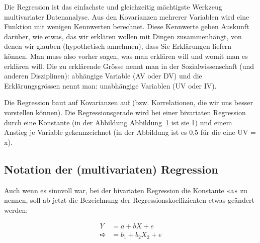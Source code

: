 \documentclass[
  10pt,
  letterpaper,
  a4paper, twoside]{scrreprt}
\begin{document}
Die Regression ist das einfachste und gleichzeitig mächtigste Werkzeug
multivariater Datenanalyse. Aus den Kovarianzen mehrerer Variablen wird
eine Funktion mit wenigen Kennwerten berechnet. Diese Kennwerte geben
Auskunft darüber, wie etwas, das wir erklären wollen mit Dingen
zusammenhängt, von denen wir glauben (hypothetisch annehmen), dass Sie
Erklärungen liefern können. Man muss also vorher sagen, was man erklären
will und womit man es erklären will. Die zu erklärende Grösse nennt man
in der Sozialwissenschaft (und anderen Disziplinen): abhängige Variable
(AV oder DV) und die Erklärungsgrössen nennt man: unabhängige Variablen
(UV oder IV).

Die Regression baut auf Kovarianzen auf (bzw. Korrelationen, die wir uns
besser vorstellen können). Die Regressionsgerade wird bei einer
bivariaten Regression durch eine Konstante (in der Abbildung
Abbildung~\ref{fig-KorrelationRegression} ist sie 1) und einem Anstieg
je Variable gekennzeichnet (in der Abbildung ist es 0,5 für die eine UV
= x).

\begin{figure}


\caption{\label{fig-KorrelationRegression}}

\end{figure}%

\subsection{Notation der (multivariaten)
Regression}\label{notation-der-multivariaten-regression}

Auch wenn es sinnvoll war, bei der bivariaten Regression die Konstante
«a» zu nennen, soll ab jetzt die Bezeichnung der
Regressionskoeffizienten etwas geändert werden:

\begin{tcolorbox}[enhanced jigsaw, coltitle=black, opacitybacktitle=0.6, toptitle=1mm, colbacktitle=quarto-callout-note-color!10!white, colback=white, toprule=.15mm, opacityback=0, bottomrule=.15mm, arc=.35mm, colframe=quarto-callout-note-color-frame, leftrule=.75mm, titlerule=0mm, breakable, left=2mm, rightrule=.15mm, title={Wir ändern die Notation etwas:}, bottomtitle=1mm]

\[
\begin{aligned}
 Y & = a + bX + e \\ 
 ➪ & = b_1 + b_2X_2 + e  
\end{aligned}
\]

\end{tcolorbox}
\end{document}
